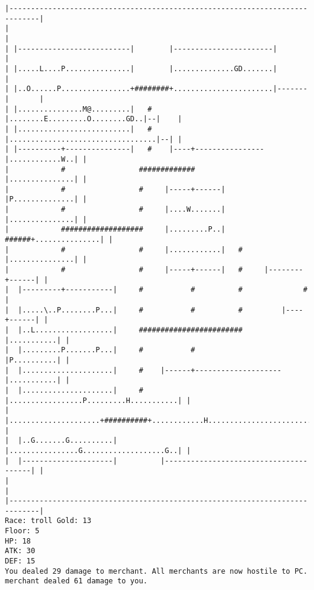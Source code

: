 \documentclass[11pt]{article}
\theoremstyle{plain}
\begin{document}
\begin{Verbatim}[fontsize=\small]
|-----------------------------------------------------------------------------|
|                                                                             |
| |--------------------------|        |-----------------------|               |
| |.....L....P...............|        |..............GD.......|               |
| |..O......P................+########+.......................|-------|       |
| |...............M@.........|   #    |........E.........O........GD..|--|    |
| |..........................|   #    |..................................|--| |
| |----------+---------------|   #    |----+----------------|............W..| |
|            #                 #############                |...............| |
|            #                 #     |-----+------|         |P..............| |
|            #                 #     |....W.......|         |...............| |
|            ###################     |.........P..|   ######+...............| |
|            #                 #     |............|   #     |...............| |
|            #                 #     |-----+------|   #     |--------+------| |
|  |---------+-----------|     #           #          #              #        |
|  |.....\..P........P...|     #           #          #         |----+------| |
|  |..L..................|     ########################         |...........| |
|  |.........P.......P...|     #           #                    |P..........| |
|  |.....................|     #    |------+--------------------|...........| |
|  |.....................|     #    |.................P.........H...........| |
|  |.....................+##########+............H..........................| |
|  |..G.......G..........|          |................G...................G..| |
|  |---------------------|          |---------------------------------------| |
|                                                                             |
|-----------------------------------------------------------------------------|
Race: troll Gold: 13                                                   Floor: 5
HP: 18
ATK: 30
DEF: 15
You dealed 29 damage to merchant. All merchants are now hostile to PC. merchant dealed 61 damage to you.
\end{Verbatim}
\end{document}
